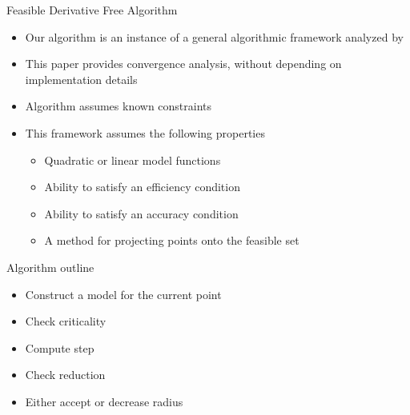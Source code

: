 \documentclass{beamer}
\begin{document}
\begin{frame}{Feasible Derivative Free Algorithm}
    \begin{itemize}
        \item Our algorithm is an instance of a general algorithmic framework analyzed by \cite{CONEJO2013324}
        \item This paper provides convergence analysis, without depending on implementation details
		\item Algorithm assumes known constraints
        \item This framework assumes the following properties
            \begin{itemize}
				\item Quadratic or linear model functions
                \item Ability to satisfy an efficiency condition
                \item Ability to satisfy an accuracy condition
                \item A method for projecting points onto the feasible set
            \end{itemize}
    \end{itemize}
\end{frame}


\begin{frame}{Algorithm outline}
	\begin{itemize}
		\item Construct a model for the current point
		\item Check criticality
		\item Compute step
		\item Check reduction
		\item Either accept or decrease radius
	\end{itemize}
\end{frame}

% 
\end{document}
